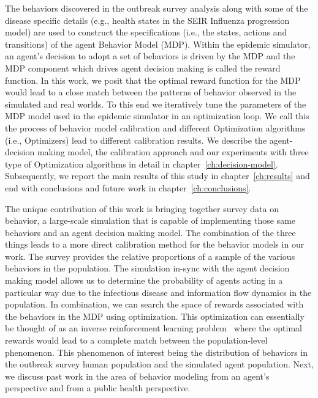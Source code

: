 \documentclass[doublespace,draft]{VTthesis}
\begin{document}
    The behaviors discovered in the outbreak survey analysis along with some of the disease specific details (e.g., health states in the SEIR Influenza progression model) are used to construct the specifications (i.e., the states, actions and transitions) of the agent Behavior Model (MDP). Within the epidemic simulator, an agent's decision to adopt a set of behaviors is driven by the MDP and the MDP component which drives agent decision making is called the reward function. In this work, we posit that the optimal reward function for the MDP would lead to a close match between the patterns of behavior observed in the simulated and real worlds. To this end we iteratively tune the parameters of the MDP model used in the epidemic simulator in an optimization loop. We call this the process of behavior model calibration and different Optimization algorithms (i.e., Optimizers) lead to different calibration results. We describe the agent-decision making model, the calibration approach and our experiments with three type of Optimization algorithms in detail in chapter~\ref{ch:decision-model}. Subsequently, we report the main results of this study in chapter~\ref{ch:results} and end with conclusions and future work in chapter~\ref{ch:conclusions}.
    
    The unique contribution of this work is bringing together survey data on behavior, a large-scale simulation that is capable of implementing those same behaviors and an agent decision making model. The combination of the three things leads to a more direct calibration method for the behavior models in our work. The survey provides the relative proportions of a sample of the various behaviors in the population. The simulation in-sync with the agent decision making model allows us to determine the probability of agents acting in a particular way due to the infectious disease and information flow dynamics in the population. In combination, we can search the space of rewards associated with the behaviors in the MDP using optimization. This optimization can essentially be thought of as an inverse reinforcement learning problem~\cite{ng00irl} where the optimal rewards would lead to a complete match between the population-level phenomenon. This phenomenon of interest being the distribution of behaviors in the outbreak survey human population and the simulated agent population. Next, we discuss past work in the area of behavior modeling from an agent's perspective and from a public health perspective.
\end{document}
